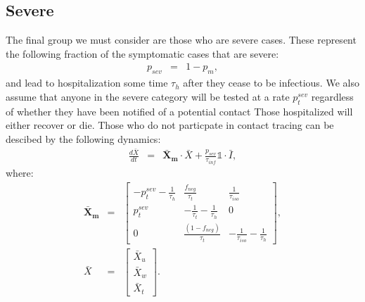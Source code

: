 \documentclass[notitlepage, superscriptaddress]{revtex4-2}
\begin{document}
\subsection{Severe}
The final group we must consider are those who are severe cases. These represent the following fraction of the symptomatic cases that are severe:
\begin{eqnarray}
p_{sev} &=& 1 - p_{m},
\end{eqnarray}
and lead to hospitalization some time $\tau_{h}$ after they cease to be infectious. We also assume that anyone in the severe category will be tested at a rate $p^{sev}_{t}$ regardless of whether they have been notified of a potential contact Those hospitalized will either recover or die. Those who do not particpate in contact tracing can be descibed by the following dynamics:
\begin{eqnarray}
\frac{d\bar{X}}{dt} &=& \boldsymbol{\bar{X}_{m}} \cdot \bar{X} + \frac{p_{sev}}{\tau_{inf}} \mathbb{1} \cdot  \bar{I}, 
\end{eqnarray}
where:
%
\begin{eqnarray}
\boldsymbol{\bar{X}_{m}} &=&
\begin{bmatrix}
- p^{sev}_{t} -\frac{1}{\tau_{h}}  &  \frac{f_{neg}}{\tau_{t}}            & \frac{1}{\tau_{iso}} \\ 
 p^{sev}_{t}              & -\frac{1}{\tau_{t}} -\frac{1}{\tau_{h}}       & 0  \\ 
 0                  & \frac{(1- f_{neg})}{\tau_{t}}                        & -\frac{1}{\tau_{iso}} -\frac{1}{\tau_{h}}
\end{bmatrix}, \\ 
%
\bar{X} &=& 
\begin{bmatrix}
\bar{X}_{u} \\ \bar{X}_{w}\\ \bar{X}_{t}
\end{bmatrix}. \\ 
%
\end{eqnarray}
\end{document}
